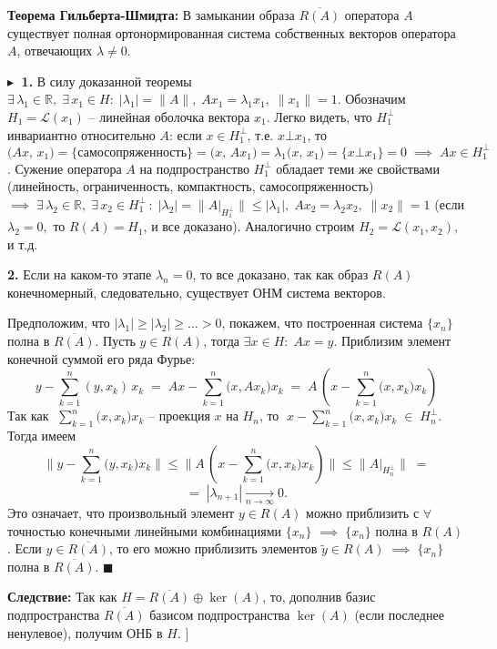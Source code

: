 \textbf{Теорема Гильберта-Шмидта:\;} В замыкании образа $\overline{R(A)}$ оператора $A$ существует полная ортонормированная система собственных векторов оператора $A$, отвечающих $\lambda \ne 0$.

$\blacktriangleright\;$ 
\textbf{1.} В силу доказанной теоремы $\exists \,\lambda_1 \in \mathbb{R}, \;\exists\,x_1\in H: \; |\lambda_1| = \|A\|, \; A x_1 = \lambda_1 x_1, \; \|x_1\| = 1$. 
Обозначим $H_1 = \mathcal{L} (x_1)$ -- линейная оболочка вектора $x_1$. Легко видеть, что $H_1^\bot$ инвариантно относительно $A$: если $x \in H_1^\bot$, т.е. $x\bot x_1$, то $\displaystyle \big(A x,\,x_1\big) = \{\textit{самосопряженность}\}=\big(x,\, A x_1\big) = \lambda_1 \big(x,\,x_1\big) = \{ x\bot x_1\} = 0 \;\implies\; A x \in H_1^\bot$. 
Сужение оператора $A$ на подпространство $H_1^\bot$ обладает теми же свойствами (линейность, ограниченность, компактность, самосопряженность) $\implies \; \exists \, \lambda_2 \in \mathbb{R}, \; \exists\,x_2 \in H_1^{\bot} \,: \; |\lambda_2| = \big\|A\big|_{H_1^\bot}\big\| \leq |\lambda_1|, \; Ax_2 = \lambda_2 x_2, \; \|x_2\| = 1$ (если $\lambda_2 = 0,$ то $R(A) = H_1$, и все доказано). Аналогично строим $H_2 = \mathcal{L}(x_1, x_2), $  и т.д.

\textbf{2.} Если на каком-то этапе $\lambda_n = 0$, то все доказано, так как образ $R(A)$ конечномерный, следовательно, существует ОНМ система векторов.

Предположим, что $|\lambda_1| \geq |\lambda_2| \geq\ldots> 0$, покажем, что построенная система $\{x_n\}$ полна в $\overline{R(A)}$. Пусть $y \in R(A)$, тогда $\exists x \in H: \; A x = y$. Приблизим элемент конечной суммой его ряда Фурье: 
$$
y - \sum\limits_{k=1}^n (y, x_k) \, x_k \;=\; A x - \sum\limits_{k=1}^n \big(x, A x_k\big) x_k\; =\; A \,\left(x - \sum\limits_{k=1}^n \big(x, x_k\big) x_k \right)
$$
Так как $\displaystyle\;\sum\limits_{k=1}^n \big(x, x_k\big) x_k$ -- проекция $x$ на $H_n$, то $\;\displaystyle x - \sum\limits_{k=1}^n \big(x, x_k\big) x_k \;\in\; H_n^\bot $. Тогда имеем 
$$
\bigg\| y - \sum\limits_{k=1}^n \big(y, x_k\big) x_k  \bigg\| \leq \bigg\| A \,\left(x - \sum\limits_{k=1}^n \big(x, x_k\big) x_k \right) \bigg\| \leq \big\|A\big|_{H_n^\bot}\big\| \;=$$
$$ =\; |\lambda_{n+1}| \xrightarrow[n\to\infty]{} 0.
$$
Это означает, что произвольный элемент $y\in R(A)$ можно приблизить с $\forall$ точностью конечными линейными комбинациями $\{x_n\}$ $\implies \;\{x_n\}$ полна в $R(A)$. Если $y \in \overline{R(A)}$, то его можно приблизить элементов $\widetilde{y} \in R(A)\; \implies \; \{x_n\}$\; полна в $\overline{R(A)}$. \; $\blacksquare$

\textbf{Следствие:\;} Так как $H = \overline{R(A)} \oplus \ker(A)$, то, дополнив базис подпространства $\overline{R(A)}$ базисом подпространства $\ker(A)$ (если последнее ненулевое), получим ОНБ в $H$.
\bigbreak
[\cite[page 24-25]{funcan_spring}]